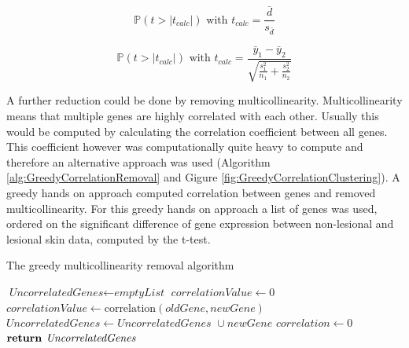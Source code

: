 \documentclass[10pt,a4paper]{article}
\begin{document}
	\begin{equation}
	\label{eq:PairedTTest}
	\mathbb{P}(t > |t_{calc}|) \text{ with } t_{calc} =\frac{\bar{d}}{s_{\bar{d}}}
	\end{equation}
	
	\begin{equation}
	\label{eq:UnequalVarianceTTest}
	\mathbb{P}(t >|t_{calc}|) \text { with } t_{calc} = \frac{\bar{y}_1 - 
		\bar{y}_2}{\sqrt{\frac{s^2_1}{n_1} + \frac{s^2_2}{n_2}}} 
	\end{equation}
	
	A further reduction could be done by removing multicollinearity. Multicollinearity means that multiple genes are highly correlated with each other. Usually this would be computed by calculating the correlation coefficient between all genes. This coefficient however was computationally quite heavy to compute and therefore an alternative approach was used (Algorithm \ref{alg:GreedyCorrelationRemoval} and Gigure \ref{fig:GreedyCorrelationClustering}). A greedy hands on approach computed correlation between genes and removed multicollinearity. For this greedy hands on approach a list of genes was used, ordered on the significant difference of gene expression between non-lesional and lesional skin data, computed by the t-test.

	\begin{algorithm}[H]
			\caption{The greedy multicollinearity removal algorithm}\label{alg:GreedyCorrelationRemoval}
			\begin{algorithmic}[1]
				\State $\textit{UncorrelatedGenes} \gets \textit{emptyList}$
				\State $\textit{correlationValue} \gets 0$
				\State $\textit{correlationValue} \gets \text{correlation}(\textit{oldGene}, newGene)$
				\EndIf
				\EndFor
				\State $\textit{UncorrelatedGenes} \gets \textit{UncorrelatedGenes } \cup newGene$
				\EndIf
				\State $\textit{correlation} \gets 0$
				\EndFor
				\State $\textbf{return } \emph{UncorrelatedGenes}$
				\EndProcedure
			\end{algorithmic}
	\end{algorithm}
\end{document}
